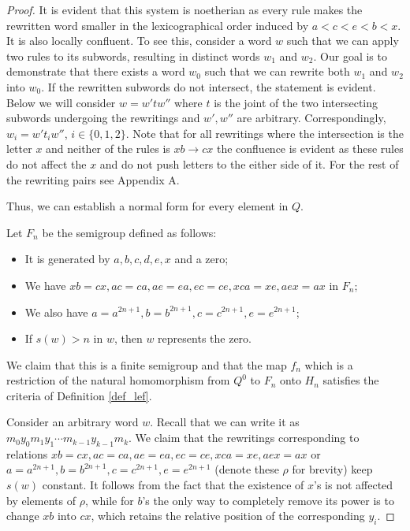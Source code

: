 \documentclass{article}
\theoremstyle{definition}
\begin{document}
\begin{proof}
It is evident that this system is noetherian as every rule makes the rewritten word smaller in the lexicographical order induced by $a<c<e<b<x$. It is also locally confluent. To see this, consider a word $w$ such that we can apply two rules to its subwords, resulting in distinct words $w_1$ and $w_2$. Our goal is to demonstrate that there exists a word $w_0$ such that we can rewrite both $w_1$ and $w_2$ into $w_0$. If the rewritten subwords do not intersect, the statement is evident. Below we will consider $w = w' t w''$ where $t$ is the joint of the two intersecting subwords undergoing the rewritings and $w', w''$ are arbitrary. Correspondingly, $w_i = w' t_i w''$, $i \in \{0,1,2\}$. Note that for all rewritings where the intersection is the letter $x$ and neither of the rules is $xb \rightarrow cx$ the confluence is evident as these rules do not affect the $x$ and do not push letters to the either side of it. For the rest of the rewriting pairs see Appendix A.

Thus, we can establish a normal form for every element in $Q$.

Let $F_n$ be the semigroup defined as follows:

\begin{itemize}
\item It is generated by $a,b,c,d,e,x$ and a zero;
\item We have $xb = cx, ac = ca, ae=ea, ec=ce, xca = xe, aex = ax$ in $F_n$;
\item We also have $a = a^{2n+1}, b = b^{2n+1}, c=c^{2n+1}, e=e^{2n+1}$;
\item If  $s(w)>n$ in $w$, then $w$ represents the zero.
\end{itemize}

We claim that this is a finite semigroup and that the map $f_n$ which is a restriction of the natural homomorphism from $Q^{0}$ to $F_n$ onto $H_n$ satisfies the criteria of Definition \ref{def_lef}.

Consider an arbitrary word $w$. Recall that we can write it as  $m_0 y_0 m_1 y_1 \cdots m_{k-1} y_{k-1} m_k$. We claim that the rewritings corresponding to relations $xb = cx, ac = ca, ae=ea, ec=ce, xca = xe, aex = ax$ or $a = a^{2n+1}, b = b^{2n+1}, c=c^{2n+1}, e=e^{2n+1}$ (denote these $\rho$ for brevity) keep $s(w)$ constant. It follows from the fact that the existence of $x$'s is not affected by elements of $\rho$, while for $b$'s the only way to completely remove its power is to change $xb$ into $cx$, which retains the relative position of the corresponding $y_i$.


\end{proof}
\end{document}
